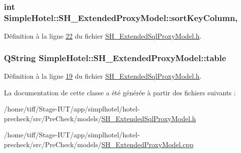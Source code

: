 \hypertarget{classSimpleHotel_1_1SH__ExtendedProxyModel_a879989e7ae305dc2794b281c5e0ab689}{
\subsubsection[{sort\-Key\-Column}]{\setlength{\rightskip}{0pt plus 5cm}int Simple\-Hotel\-::\-S\-H\-\_\-\-Extended\-Proxy\-Model\-::sort\-Key\-Column\hspace{0.3cm}{\ttfamily [read]}, {\ttfamily [write]}}}\label{classSimpleHotel_1_1SH__ExtendedProxyModel_a879989e7ae305dc2794b281c5e0ab689}


Définition à la ligne \hyperlink{SH__ExtendedSqlProxyModel_8h_source_l00022}{22} du fichier \hyperlink{SH__ExtendedSqlProxyModel_8h_source}{S\-H\-\_\-\-Extended\-Sql\-Proxy\-Model.\-h}.

\hypertarget{classSimpleHotel_1_1SH__ExtendedProxyModel_a98cd3050230163561b4dac11a9675b8e}{
\subsubsection[{table}]{\setlength{\rightskip}{0pt plus 5cm}Q\-String Simple\-Hotel\-::\-S\-H\-\_\-\-Extended\-Proxy\-Model\-::table\hspace{0.3cm}{\ttfamily [read]}}}\label{classSimpleHotel_1_1SH__ExtendedProxyModel_a98cd3050230163561b4dac11a9675b8e}


Définition à la ligne \hyperlink{SH__ExtendedSqlProxyModel_8h_source_l00019}{19} du fichier \hyperlink{SH__ExtendedSqlProxyModel_8h_source}{S\-H\-\_\-\-Extended\-Sql\-Proxy\-Model.\-h}.



La documentation de cette classe a été générée à partir des fichiers suivants \-:\begin{DoxyCompactItemize}
\item 
/home/tiff/\-Stage-\/\-I\-U\-T/app/simplhotel/hotel-\/precheck/src/\-Pre\-Check/models/\hyperlink{SH__ExtendedSqlProxyModel_8h}{S\-H\-\_\-\-Extended\-Sql\-Proxy\-Model.\-h}\item 
/home/tiff/\-Stage-\/\-I\-U\-T/app/simplhotel/hotel-\/precheck/src/\-Pre\-Check/models/\hyperlink{SH__ExtendedProxyModel_8cpp}{S\-H\-\_\-\-Extended\-Proxy\-Model.\-cpp}\end{DoxyCompactItemize}
